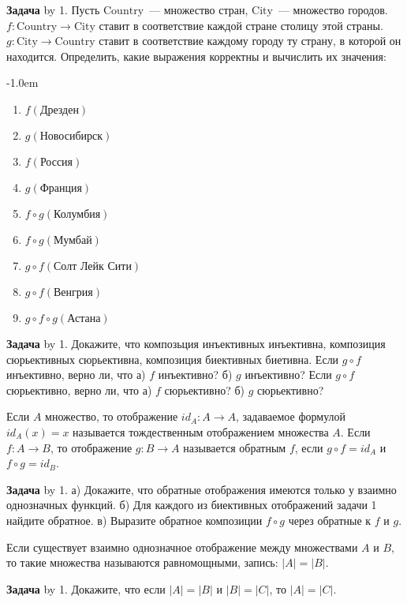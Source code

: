 \documentclass[a4paper,10pt]{article}
\def\problem{\textbf{Задача \the\problemnum}\advance\problemnum by 1}
\begin{document}
\problem. Пусть $\mathrm{Country}$~--- множество стран, $\mathrm{City}$~--- множество городов. $f:\mathrm{Country}\to\mathrm{City}$ ставит в соответствие каждой стране столицу этой страны. $g:\mathrm{City}\to\mathrm{Country}$ ставит в соответствие каждому городу ту страну, в которой он находится. Определить, какие выражения корректны и вычислить их значения: \par\kern-1.0em
\begin{multicols}{3}
	\begin{enumerate}[label=(\arabic*)\,]
		\item $f(\text{Дрезден})$
		\item $g(\text{Новосибирск})$
		\item $f(\text{Россия})$
		\item $g(\text{Франция})$
		\item $f\circ g(\text{Колумбия})$
		\item $f\circ g(\text{Мумбай})$
		\item $g\circ f(\text{Солт Лейк Сити})$
		\item $g\circ f(\text{Венгрия})$
		\item $g\circ f\circ g(\text{Астана})$
	\end{enumerate}
\end{multicols}
\problem. Докажите, что композьция инъективных инъективна, композиция сюрьективных сюрьективна, композиция биективных биетивна. Если $g\circ f$ инъективно, верно ли, что а) $f$ инъективно? б) $g$ инъективно? Если $g\circ f$ сюрьективно, верно ли, что а) $f$ сюрьективно? б) $g$ сюрьективно?

Если $A$ множество, то отображение $id_A: A\to A$, задаваемое формулой $id_A(x)=x$ называется тождественным отображением множества $A$. Если $f: A\to B$, то отображение $g: B\to A$ называется обратным $f$, если $g\circ f=id_A$ и $f\circ g=id_B$.

\problem. а) Докажите, что обратные отображения имеются только у взаимно однозначных функций. б) Для каждого из биективных отображений задачи 1 найдите обратное. в) Выразите обратное композиции $f\circ g$ через обратные к $f$ и $g$.

Если существует взаимно однозначное отображение между множествами $A$ и $B$, то такие множества называются равномощными, запись: $|A|=|B|$.

\problem. Докажите, что если $|A|=|B|$ и $|B|=|C|$, то $|A|=|C|$.
\end{document}
